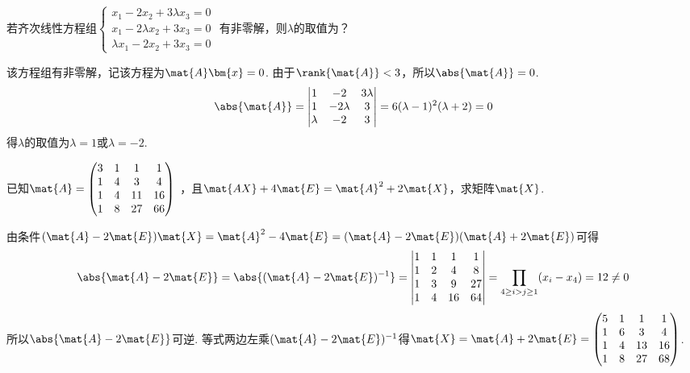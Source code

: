 \begin{problem}
    若齐次线性方程组$\begin{cases}
        x_1-2x_2+3\lambda x_3=0\\
        x_1-2\lambda x_2+3x_3=0\\
        \lambda x_1-2x_2+3x_3=0
    \end{cases}$
    有非零解，则$\lambda$的取值为？
\end{problem}
\begin{solution}
    该方程组有非零解，记该方程为$\mat{A}\bm{x}=0$. 由于$\rank{\mat{A}}<3$，所以$\abs{\mat{A}}=0$.
    \[\abs{\mat{A}}=\begin{vmatrix}
        1 & -2 & 3\lambda\\
        1 & -2\lambda & 3\\
        \lambda & -2 & 3
    \end{vmatrix}
    =6(\lambda-1)^2(\lambda+2)=0\]
    得$\lambda$的取值为$\lambda=1$或$\lambda=-2$.
\end{solution}

\begin{problem}
已知$\mat{A}=\begin{pmatrix}
    3 & 1 & 1 & 1\\
    1 & 4 & 3 & 4\\
    1 & 4 & 11 & 16\\
    1 & 8 & 27 & 66
\end{pmatrix}$
，且$\mat{AX}+4\mat{E}=\mat{A}^2+2\mat{X}$，求矩阵$\mat{X}$.
\end{problem}
\begin{solution}
    由条件$(\mat{A}-2\mat{E})\mat{X}=\mat{A}^2-4\mat{E}=(\mat{A}-2\mat{E})(\mat{A}+2\mat{E})$可得
    \[\abs{\mat{A}-2\mat{E}}=\abs{(\mat{A}-2\mat{E})^{-1}}=\begin{vmatrix}
        1 & 1 & 1 & 1\\
        1 & 2 & 4 & 8\\
        1 & 3 & 9 & 27\\
        1 & 4 & 16 & 64
    \end{vmatrix}=\prod_{4\geq i>j\geq 1}(x_i-x_4)=12\neq 0\]
    所以$\abs{\mat{A}-2\mat{E}}$可逆. 等式两边左乘$(\mat{A}-2\mat{E})^{-1}$得$\mat{X}=\mat{A}+2\mat{E}=\begin{pmatrix}
        5 & 1 & 1 & 1\\
        1 & 6 & 3 & 4\\
        1 & 4 & 13 & 16\\
        1 & 8 & 27 & 68
    \end{pmatrix}$.
\end{solution}

